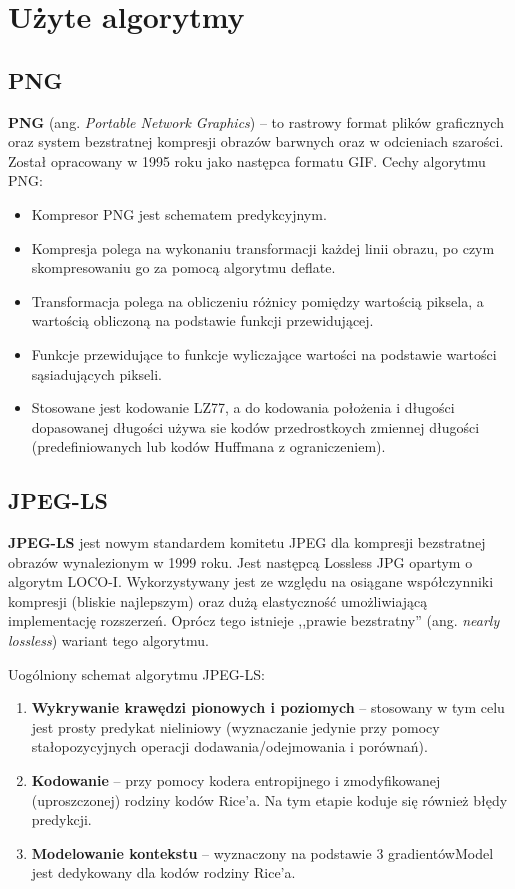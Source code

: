 \section{Użyte algorytmy}

\subsection{PNG}

\textbf{PNG} (ang. \textit{Portable Network Graphics}) -- to rastrowy format plików graficznych oraz system bezstratnej kompresji obrazów barwnych oraz w odcieniach szarości. Został opracowany w 1995 roku jako następca formatu GIF.
Cechy algorytmu PNG:

\begin{itemize}
	\item Kompresor PNG jest schematem predykcyjnym.
	\item Kompresja polega na wykonaniu transformacji każdej linii obrazu, po czym skompresowaniu go za pomocą algorytmu deflate.
	\item Transformacja polega na obliczeniu różnicy pomiędzy wartością piksela, a wartością obliczoną na podstawie funkcji przewidującej.
	\item Funkcje przewidujące to funkcje wyliczające wartości na podstawie wartości sąsiadujących pikseli.
	\item Stosowane jest kodowanie LZ77, a do kodowania położenia i długości dopasowanej długości używa sie kodów przedrostkoych zmiennej długości (predefiniowanych lub kodów Huffmana z ograniczeniem).
\end{itemize}

\subsection{JPEG-LS}

\textbf{JPEG-LS} jest nowym standardem komitetu JPEG dla kompresji bezstratnej obrazów wynalezionym w 1999 roku. Jest następcą Lossless JPG opartym o algorytm LOCO-I. Wykorzystywany jest ze względu na osiągane współczynniki kompresji (bliskie najlepszym) oraz dużą elastyczność umożliwiającą implementację rozszerzeń. Oprócz tego istnieje ,,prawie bezstratny'' (ang. \textit{nearly lossless}) wariant tego algorytmu.

Uogólniony schemat algorytmu JPEG-LS:

\begin{enumerate}
	\item \textbf{Wykrywanie krawędzi pionowych i poziomych} -- stosowany w tym celu jest prosty predykat nieliniowy (wyznaczanie jedynie przy pomocy stałopozycyjnych operacji dodawania/odejmowania i porównań).
	\item \textbf{Kodowanie} -- przy pomocy kodera entropijnego i zmodyfikowanej (uproszczonej) rodziny kodów Rice'a. Na tym etapie koduje się również błędy predykcji.
	\item \textbf{Modelowanie kontekstu} -- wyznaczony na podstawie 3 gradientówModel jest dedykowany dla kodów rodziny Rice'a.
\end{enumerate}

